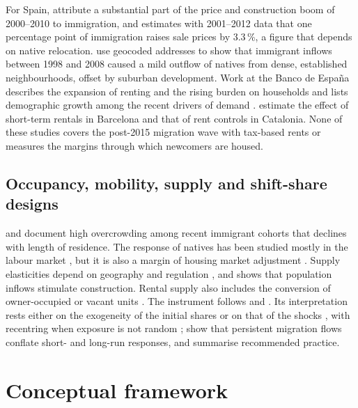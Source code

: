 \documentclass[11pt,a4paper]{article}
\begin{document}
For Spain, \citet{gonzalez2013} attribute a substantial part of the price and construction boom of 2000--2010 to immigration, and \citet{sanchis2023} estimates with 2001--2012 data that one percentage point of immigration raises sale prices by 3.3\,\%, a figure that depends on native relocation. \citet{fernandez2019} use geocoded addresses to show that immigrant inflows between 1998 and 2008 caused a mild outflow of natives from dense, established neighbourhoods, offset by suburban development. Work at the Banco de España describes the expansion of renting and the rising burden on households \citep{lopez2019,khametshin2024} and lists demographic growth among the recent drivers of demand \citep{bde2024,lajer2024}. \citet{garcia2020} estimate the effect of short-term rentals in Barcelona and \citet{monras2023} that of rent controls in Catalonia. None of these studies covers the post-2015 migration wave with tax-based rents or measures the margins through which newcomers are housed.

\subsection{Occupancy, mobility, supply and shift-share designs}

\citet{myers1996} and \citet{myerslee1996} document high overcrowding among recent immigrant cohorts that declines with length of residence. The response of natives has been studied mostly in the labour market \citep{card2000,card2001,mocetti2010}, but it is also a margin of housing market adjustment \citep{sa2015,sanchis2023}. Supply elasticities depend on geography and regulation \citep{saiz2010,glaeser2018}, and \citet{howard2020} shows that population inflows stimulate construction. Rental supply also includes the conversion of owner-occupied or vacant units \citep{monras2023}. The instrument follows \citet{altonji1991} and \citet{card2001}. Its interpretation rests either on the exogeneity of the initial shares \citep{goldsmith2020} or on that of the shocks \citep{borusyak2022,adao2019}, with recentring when exposure is not random \citep{borusyak2023}; \citet{jaeger2018} show that persistent migration flows conflate short- and long-run responses, and \citet{borusyak2025} summarise recommended practice.

\section{Conceptual framework}\label{sec:model}
\end{document}
